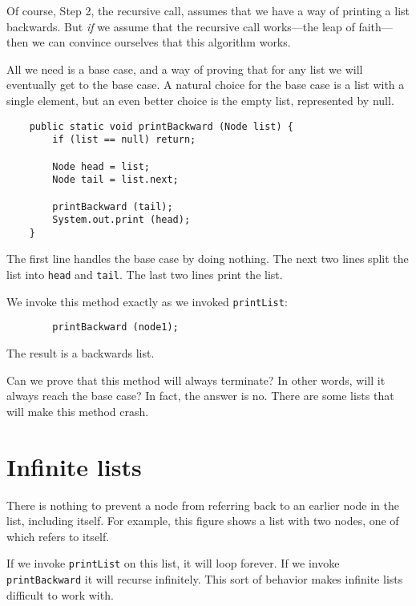 Of course, Step 2, the recursive call, assumes that we have a way of
printing a list backwards.  But {\em if} we assume that the recursive
call works---the leap of faith---then we can convince ourselves that
this algorithm works.


All we need is a base case, and a way of proving that for
any list we will eventually get to the base case.  A natural
choice for the base case is a list with a single element, but
an even better choice is the empty list, represented by null.

\begin{verbatim}
    public static void printBackward (Node list) {
        if (list == null) return;

        Node head = list;
        Node tail = list.next;

        printBackward (tail);
        System.out.print (head);
    }    
\end{verbatim}
%
The first line handles the base case by doing nothing.  The
next two lines split the list into {\tt head} and {\tt tail}.
The last two lines print the list.

We invoke this method exactly as we invoked {\tt printList}:

\begin{verbatim}
        printBackward (node1);
\end{verbatim}
%
The result is a backwards list.

Can we prove that this method will always terminate?   In other
words, will it always reach the base case?  In fact, the answer
is no.  There are some lists that will make this method crash.


\section{Infinite lists}

There is nothing to prevent a node from referring back to
an earlier node in the list, including itself.  For example,
this figure shows a list with two nodes, one of which refers
to itself.


If we invoke {\tt printList} on this list, it will loop forever.
If we invoke {\tt printBackward} it will recurse infinitely.
This sort of behavior makes infinite lists difficult to work
with.

